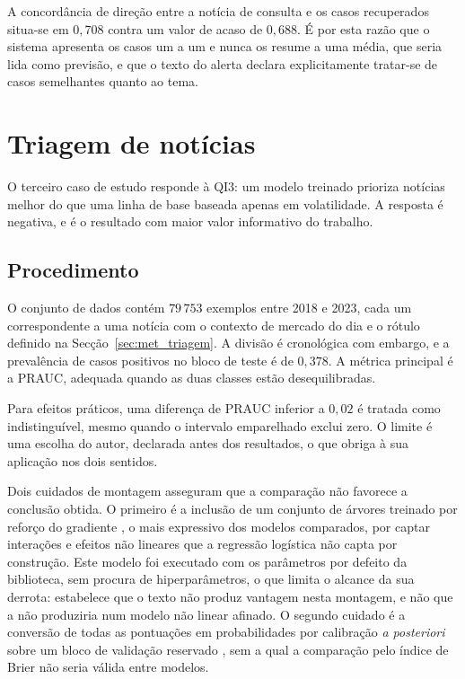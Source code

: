 A concordância de direção entre a notícia de consulta e os casos recuperados situa-se em $0{,}708$
contra um valor de acaso de $0{,}688$. É por esta razão que o sistema apresenta os casos um a um e
nunca os resume a uma média, que seria lida como previsão, e que o texto do alerta declara
explicitamente tratar-se de casos semelhantes quanto ao tema.

\section{Triagem de notícias}
\label{sec:av_qi3}

O terceiro caso de estudo responde à \gls{QI}3: um modelo treinado prioriza notícias melhor do que
uma linha de base baseada apenas em volatilidade. A resposta é negativa, e é o resultado com maior
valor informativo do trabalho.

\subsection{Procedimento}

O conjunto de dados contém $79\,753$ exemplos entre 2018 e 2023, cada um correspondente a uma notícia
com o contexto de mercado do dia e o rótulo definido na Secção~\ref{sec:met_triagem}. A divisão é
cronológica com embargo, e a prevalência de casos positivos no bloco de teste é de $0{,}378$. A
métrica principal é a \gls{PRAUC}, adequada quando as duas classes estão desequilibradas.

Para efeitos práticos, uma diferença de \gls{PRAUC} inferior a $0{,}02$ é tratada como
indistinguível, mesmo quando o intervalo emparelhado exclui zero. O limite é uma escolha do autor,
declarada antes dos resultados, o que obriga à sua aplicação nos dois sentidos.

Dois cuidados de montagem asseguram que a comparação não favorece a conclusão obtida. O primeiro é a
inclusão de um conjunto de árvores treinado por reforço do gradiente \autocite{friedman2001gbm}, o
mais expressivo dos modelos comparados, por captar interações e efeitos não lineares que a regressão
logística não capta por construção. Este modelo foi executado com os parâmetros por defeito da
biblioteca, sem procura de hiperparâmetros, o que limita o alcance da sua derrota: estabelece que o
texto não produz vantagem nesta montagem, e não que a não produziria num modelo não linear afinado.
O segundo cuidado é a conversão de todas as pontuações em probabilidades por calibração \emph{a
posteriori} sobre um bloco de validação reservado \autocite{niculescu2005calibration}, sem a qual a
comparação pelo índice de Brier não seria válida entre modelos.

